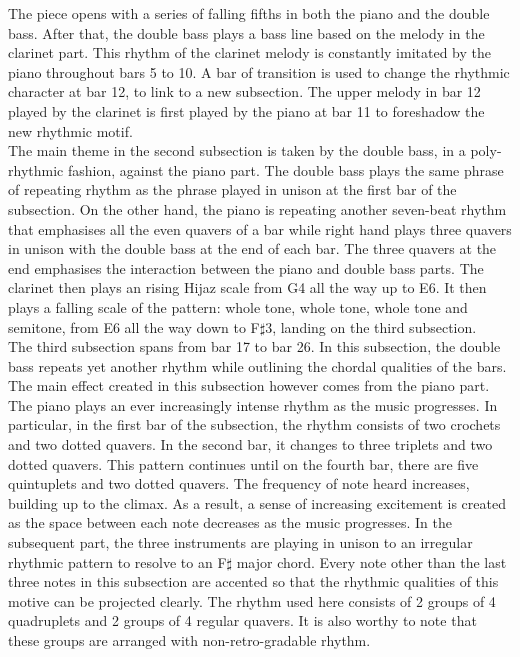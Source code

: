 \documentclass{article}
\begin{document}
The piece opens with a series of falling fifths in both the piano and the double bass. After that, the double bass plays a bass line based on the melody in the clarinet part. This rhythm of the clarinet melody is constantly imitated by the piano throughout bars 5 to 10. A bar of transition is used to change the rhythmic character at bar 12, to link to a new subsection. The upper melody in bar 12 played by the clarinet is first played by the piano at bar 11 to foreshadow the new rhythmic motif.\\

The main theme in the second subsection is taken by the double bass, in a poly-rhythmic fashion, against the piano part. The double bass plays the same phrase of repeating rhythm as the phrase played in unison at the first bar of the subsection. On the other hand, the piano is repeating another seven-beat rhythm that emphasises all the even quavers of a bar while right hand plays three quavers in unison with the double bass at the end of each bar. The three quavers at the end emphasises the interaction between the piano and double bass parts. The clarinet then plays an rising Hijaz scale from G4 all the way up to E6. It then plays a falling scale of the pattern: whole tone, whole tone, whole tone and semitone, from E6 all the way down to F\(\sharp\)3, landing on the third subsection.\\

The third subsection spans from bar 17 to bar 26. In this subsection, the double bass repeats yet another rhythm while outlining the chordal qualities of the bars. The main effect created in this subsection however comes from the piano part. The piano plays an ever increasingly intense rhythm as the music progresses. In particular, in the first bar of the subsection, the rhythm consists of two crochets and two dotted quavers. In the second bar, it changes to three triplets and two dotted quavers. This pattern continues until on the fourth bar, there are five quintuplets and two dotted quavers. The frequency of note heard increases, building up to the climax. As a result, a sense of increasing excitement is created as the space between each note decreases as the music progresses. In the subsequent part, the three instruments are playing in unison to an irregular rhythmic pattern to resolve to an F\(\sharp\) major chord. Every note other than the last three notes in this subsection are accented so that the rhythmic qualities of this motive can be projected clearly. The rhythm used here consists of 2 groups of 4 quadruplets and 2 groups of 4 regular quavers. It is also worthy to note that these groups are arranged with non-retro-gradable rhythm.\\
\end{document}
